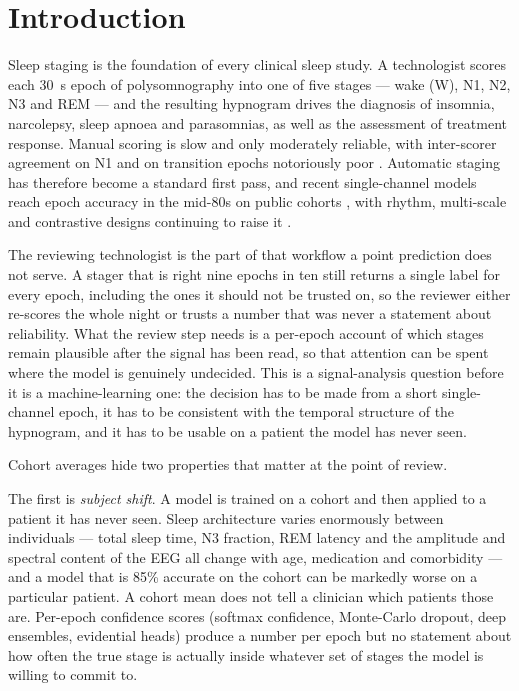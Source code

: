 \section{Introduction}
\label{sec:intro}

Sleep staging is the foundation of every clinical sleep study. A technologist
scores each \SI{30}{\second} epoch of polysomnography into one of five stages
--- wake (W), N1, N2, N3 and REM --- and the resulting hypnogram drives the
diagnosis of insomnia, narcolepsy, sleep apnoea and parasomnias, as well as
the assessment of treatment response. Manual scoring is slow and only
moderately reliable, with inter-scorer agreement on N1 and on transition
epochs notoriously poor \citep{rosenberg2013}. Automatic staging has therefore
become a standard first pass, and recent single-channel models reach epoch
accuracy in the mid-80s on public cohorts
\citep{lawhern2018,phan2019seqsleepnet,perslev2021,phan2022sleepformer},
with rhythm, multi-scale and contrastive designs continuing to raise it
\citep{zhou2026bspc,fan2025bspc}.

The reviewing technologist is the part of that workflow a point prediction
does not serve. A stager that is right nine epochs in ten still returns a
single label for every epoch, including the ones it should not be trusted on,
so the reviewer either re-scores the whole night or trusts a number that was
never a statement about reliability. What the review step needs is a
per-epoch account of which stages remain plausible after the signal has been
read, so that attention can be spent where the model is genuinely undecided.
This is a signal-analysis question before it is a machine-learning one: the
decision has to be made from a short single-channel epoch, it has to be
consistent with the temporal structure of the hypnogram, and it has to be
usable on a patient the model has never seen.

Cohort averages hide two properties that matter at the point of review.

The first is \emph{subject shift}. A model is trained on a cohort and then
applied to a patient it has never seen. Sleep architecture varies enormously
between individuals --- total sleep time, N3 fraction, REM latency and the
amplitude and spectral content of the EEG all change with age, medication and
comorbidity --- and a model that is 85\% accurate on the cohort can be
markedly worse on a particular patient. A cohort mean does not tell a
clinician which patients those are. Per-epoch confidence scores (softmax
confidence, Monte-Carlo dropout, deep ensembles, evidential heads) produce a
number per epoch but no statement about how often the true stage is actually
inside whatever set of stages the model is willing to commit to.

